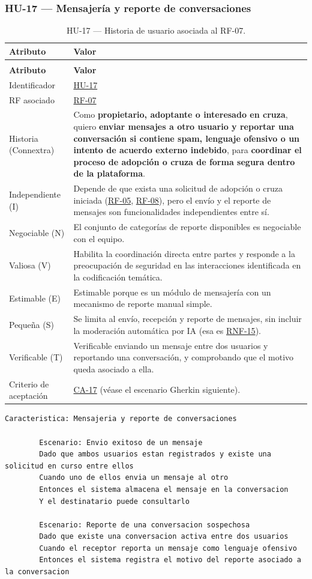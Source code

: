 \documentclass[journal,onecolumn]{IEEEtran}
\makeatletter
\newenvironment{atributos}[2]{%
	\small
	\begin{longtable}{@{}>{\raggedright\arraybackslash}p{4.2cm} >{\raggedright\arraybackslash}p{11.2cm}@{}}
		\caption{#2}\label{tab:#1}\\
		\toprule
		\textbf{Atributo} & \textbf{Valor} \\
		\midrule
		\endfirsthead
		\multicolumn{2}{@{}l}{\small\itshape (continuación)}\\
		\toprule
		\textbf{Atributo} & \textbf{Valor} \\
		\midrule
		\endhead
		\bottomrule
		\endlastfoot
	}{%
	\end{longtable}
	\normalsize
}
\makeatother
\begin{document}
	\subsubsection{HU-17 --- Mensajería y reporte de conversaciones}
	
	\begin{atributos}{HU-17}{HU-17 --- Historia de usuario asociada al RF-07.}
		Identificador & \hyperref[tab:HU-17]{HU-17} \\
		RF asociado & \hyperref[tab:RF-07]{RF-07} \\
		Historia (Connextra) & Como \textbf{propietario, adoptante o interesado en cruza}, quiero \textbf{enviar mensajes a otro usuario y reportar una conversación si contiene spam, lenguaje ofensivo o un intento de acuerdo externo indebido}, para \textbf{coordinar el proceso de adopción o cruza de forma segura dentro de la plataforma}. \\
		Independiente (I) & Depende de que exista una solicitud de adopción o cruza iniciada (\hyperref[tab:RF-05]{RF-05}, \hyperref[tab:RF-08]{RF-08}), pero el envío y el reporte de mensajes son funcionalidades independientes entre sí. \\
		Negociable (N) & El conjunto de categorías de reporte disponibles es negociable con el equipo. \\
		Valiosa (V) & Habilita la coordinación directa entre partes y responde a la preocupación de seguridad en las interacciones identificada en la codificación temática. \\
		Estimable (E) & Estimable porque es un módulo de mensajería con un mecanismo de reporte manual simple. \\
		Pequeña (S) & Se limita al envío, recepción y reporte de mensajes, sin incluir la moderación automática por IA (esa es \hyperref[tab:RNF-15]{RNF-15}). \\
		Verificable (T) & Verificable enviando un mensaje entre dos usuarios y reportando una conversación, y comprobando que el motivo queda asociado a ella. \\
		Criterio de aceptación & \hyperref[lst:ca17]{CA-17} (véase el escenario Gherkin siguiente). \\
	\end{atributos}
	
	\begin{lstlisting}[style=gherkin,caption={CA-17 --- Escenario de aceptación de la historia HU-17.},label={lst:ca17}]
		Caracteristica: Mensajeria y reporte de conversaciones
		
		Escenario: Envio exitoso de un mensaje
		Dado que ambos usuarios estan registrados y existe una solicitud en curso entre ellos
		Cuando uno de ellos envia un mensaje al otro
		Entonces el sistema almacena el mensaje en la conversacion
		Y el destinatario puede consultarlo
		
		Escenario: Reporte de una conversacion sospechosa
		Dado que existe una conversacion activa entre dos usuarios
		Cuando el receptor reporta un mensaje como lenguaje ofensivo
		Entonces el sistema registra el motivo del reporte asociado a la conversacion
	\end{lstlisting}
	
\end{document}
